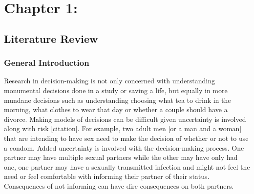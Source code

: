 \documentclass[
  english,
  donotrepeattitle,doc, 12pt, a4paper,floatsintext]{apa7}
\begin{document}
\mbox{}\thispagestyle{empty}\clearpage

\newpage

\tableofcontents

\newpage

\hypertarget{chapter-1}{%
\section{Chapter 1:}\label{chapter-1}}

\hypertarget{literature-review}{%
\subsection{Literature Review}\label{literature-review}}

\hypertarget{general-introduction}{%
\subsubsection{General Introduction}\label{general-introduction}}

Research in decision-making is not only concerned with understanding monumental decisions done in a study or saving a life, but equally in more mundane decisions such as understanding choosing what tea to drink in the morning, what clothes to wear that day or whether a couple should have a divorce. Making models of decisions can be difficult given uncertainty is involved along with risk {[}citation{]}. For example, two adult men {[}or a man and a woman{]} that are intending to have sex need to make the decision of whether or not to use a condom. Added uncertainty is involved with the decision-making process. One partner may have multiple sexual partners while the other may have only had one, one partner may have a sexually transmitted infection and might not feel the need or feel comfortable with informing their partner of their status. Consequences of not informing can have dire consequences on both partners.
\end{document}
